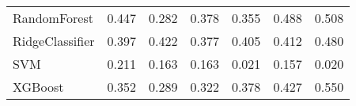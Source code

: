 \begin{tabular}{lllllll}
                   RandomForest & 0.447 &                     0.282 &                 0.378 &                  0.355 &                                   0.488 &    0.508 \\
                RidgeClassifier & 0.397 &                     0.422 &                 0.377 &                  0.405 &                                   0.412 &    0.480 \\
                            SVM & 0.211 &                     0.163 &                 0.163 &                  0.021 &                                   0.157 &    0.020 \\
                        XGBoost & 0.352 &                     0.289 &                 0.322 &                  0.378 &                                   0.427 &    0.550 \\
\bottomrule
\end{tabular}
